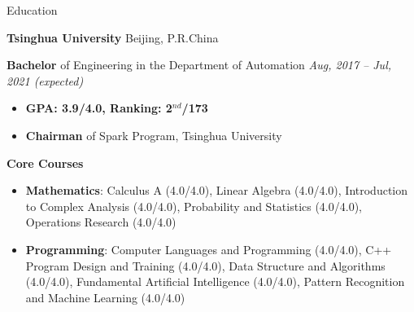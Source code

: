 \documentclass{resume} %
\begin{document}

\begin{rSection}{Education}

{\textbf{Tsinghua University}} \hfill {Beijing, P.R.China}

\textbf{Bachelor} of Engineering in the Department of Automation \hfill {\em Aug, 2017 -- Jul, 2021 (expected)}
\begin{itemize}
    \item \textbf{GPA: 3.9/4.0, Ranking: 2$^{nd}$/173}
    \item \textbf{Chairman} of Spark Program, Tsinghua University
\end{itemize}

\textbf{Core Courses}
\begin{spacing}{1.05}
\begin{itemize}
    \item \textbf{Mathematics}: Calculus A (4.0/4.0), 
    Linear Algebra (4.0/4.0), 
    Introduction to Complex Analysis (4.0/4.0), 
    Probability and Statistics (4.0/4.0), 
    Operations Research (4.0/4.0)
    \item \textbf{Programming}: Computer Languages and Programming (4.0/4.0), 
    C++ Program Design and Training (4.0/4.0), 
    Data Structure and Algorithms (4.0/4.0), 
    Fundamental Artificial Intelligence (4.0/4.0), 
    Pattern Recognition and Machine Learning (4.0/4.0)
\end{itemize}
\end{spacing}

\end{rSection}
\end{document}
